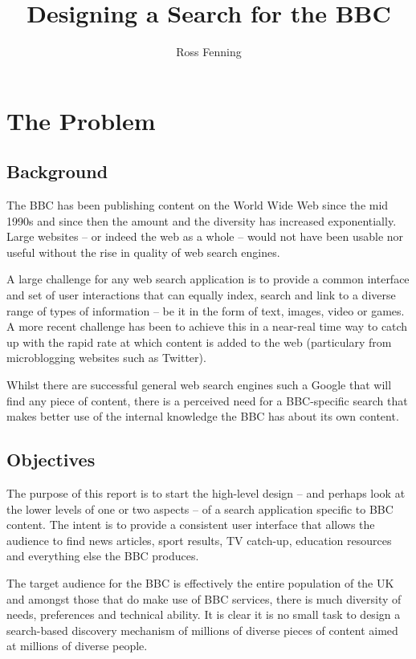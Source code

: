 \documentclass[oribibl]{llncs}
\title{Designing a Search for the BBC}
\author{Ross Fenning\inst{1}}
\institute{BBC \email{Ross.Fenning@bbc.co.uk}}
\begin{document}
\maketitle

\begin{abstract}

\end{abstract}

\section{The Problem}

\subsection{Background}

The BBC has been publishing content on the World Wide Web since the
mid 1990s and since then the amount and the diversity has increased
exponentially. Large websites -- or indeed the web as a whole --
would not have been usable nor useful without the rise in quality of
web search engines.

A large challenge for any web search application is to provide a common
interface and set of user interactions that can equally index, search
and link to a diverse range of types of information -- be it in the form
of text, images, video or games. A more recent challenge has been to
achieve this in a near-real time way to catch up with the rapid rate at
which content is added to the web (particulary from microblogging websites
such as Twitter).

Whilst there are successful general web search engines such a Google that
will find any piece of content, there is a perceived need for a
BBC-specific search that makes better use of the internal knowledge the BBC
has about its own content.

\subsection{Objectives}

The purpose of this report is to start the high-level design -- and perhaps
look at the lower levels of one or two aspects -- of a search application
specific to BBC content. The intent is to provide a consistent user interface
that allows the audience to find news articles, sport results,
TV catch-up, education resources and everything else the BBC produces.

The target audience for the BBC is effectively the entire population of the UK
and amongst those that do make use of BBC services, there is much diversity
of needs, preferences and technical ability. It is clear it is no small
task to design a search-based discovery mechanism of millions of diverse
pieces of content aimed at millions of diverse people.
\end{document}
